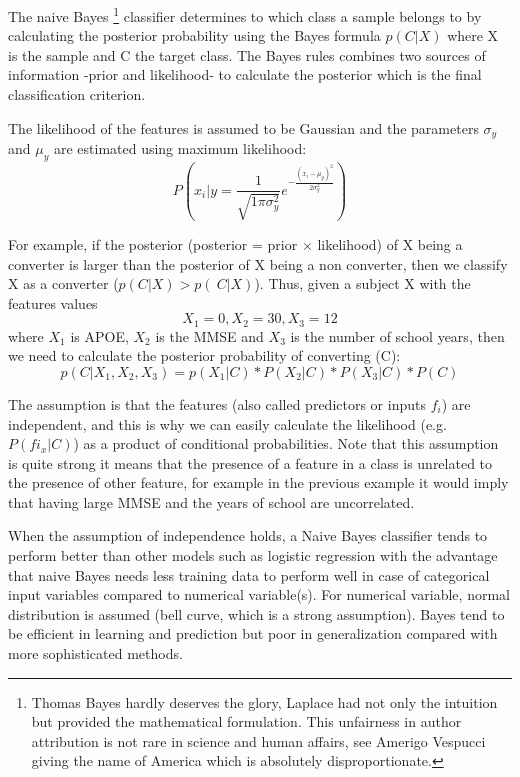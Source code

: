 \documentclass[11pt]{article}
\theoremstyle{definition}
\theoremstyle{remark}
\begin{document}
{%
The naive Bayes \footnote{Thomas Bayes hardly deserves the glory, Laplace had not only the intuition but provided the mathematical formulation. This unfairness in author attribution is not rare in science and human affairs, see Amerigo Vespucci giving the name of America which is absolutely disproportionate.} classifier determines to which class a sample belongs to by calculating the posterior probability using the Bayes formula $p(C|X)$ where X is the sample and C the target class.
The Bayes rules combines two sources of information -prior and likelihood- to calculate the posterior which is the final classification criterion. 

The likelihood of the features is assumed to be Gaussian and the parameters $\sigma_y$ and $\mu_y$ are estimated using maximum likelihood:
\begin{equation} \label{eq:naiveb}
P(x_i|y= \frac{1}{\sqrt{1\pi\sigma_y^{2}}}e^{-\frac{(x_i-\mu_y)^2}{2\sigma_y^2}})
\end{equation}


For example, if the posterior (posterior = prior $\times$ likelihood) of X being a converter is larger than the posterior of X being a non converter, then we classify X as a converter ($p(C|X) > p(~C|X)$). Thus, given a subject X with the features values 
\begin{equation*}
X_1 = 0, X_2=30, X_3=12
\end{equation*}
where $X_1$ is APOE, $X_2$ is the MMSE and $X_3$ is the number of school years, then we need to calculate the 
posterior probability of converting (C):
\begin{equation*}
p(C|X_1,X_2,X_3) = p(X_1|C) * P(X_2|C) * P(X_3|C) * P(C)
\end{equation*}

The assumption is that the features (also called predictors or inputs $f_i$) are independent, and this is why we can easily calculate the likelihood (e.g. $P(fi_x|C)$) as a product of conditional probabilities. Note that this assumption is quite strong it means that the presence of a feature in a class is unrelated to the presence of other feature, for example in the previous example it would imply that having large MMSE and the years of school are uncorrelated.

When the assumption of independence holds, a Naive Bayes classifier tends to perform better than other models such as logistic regression with the advantage that naive Bayes needs less training data to perform well in case of categorical input variables compared to numerical variable(s). For numerical variable, normal distribution is assumed (bell curve, which is a strong assumption).
Bayes tend to be efficient in learning and prediction but poor in generalization compared with more sophisticated methods.

}
\end{document}
